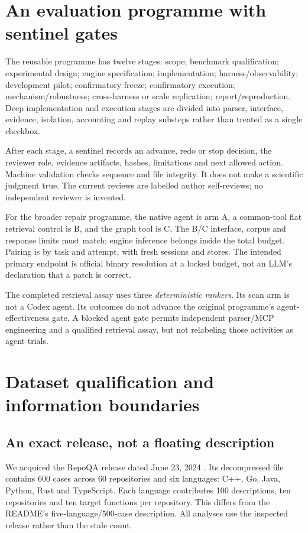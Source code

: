 \documentclass[11pt]{article}
\begin{document}
\section{An evaluation programme with sentinel gates}
The reusable programme has twelve stages: scope; benchmark qualification; experimental design; engine specification; implementation; harness/observability; development pilot; confirmatory freeze; confirmatory execution; mechanism/robustness; cross-harness or scale replication; report/reproduction. Deep implementation and execution stages are divided into parser, interface, evidence, isolation, accounting and replay substeps rather than treated as a single checkbox.

After each stage, a sentinel records an advance, redo or stop decision, the reviewer role, evidence artifacts, hashes, limitations and next allowed action. Machine validation checks sequence and file integrity. It does not make a scientific judgment true. The current reviews are labelled author self-reviews; no independent reviewer is invented.

For the broader repair programme, the native agent is arm A, a common-tool flat retrieval control is B, and the graph tool is C. The B/C interface, corpus and response limits must match; engine inference belongs inside the total budget. Pairing is by task and attempt, with fresh sessions and stores. The intended primary endpoint is official binary resolution at a locked budget, not an LLM's declaration that a patch is correct.

The completed retrieval assay uses three \emph{deterministic rankers}. Its scan arm is not a Codex agent. Its outcomes do not advance the original programme's agent-effectiveness gate. A blocked agent gate permits independent parser/MCP engineering and a qualified retrieval assay, but not relabeling those activities as agent trials.

\section{Dataset qualification and information boundaries}
\subsection{An exact release, not a floating description}
We acquired the RepoQA release dated June 23, 2024 \citep{repoqadata}. Its decompressed file contains 600 cases across 60 repositories and six languages: C++, Go, Java, Python, Rust and TypeScript. Each language contributes 100 descriptions, ten repositories and ten target functions per repository. This differs from the README's five-language/500-case description. All analyses use the inspected release rather than the stale count.
\end{document}
